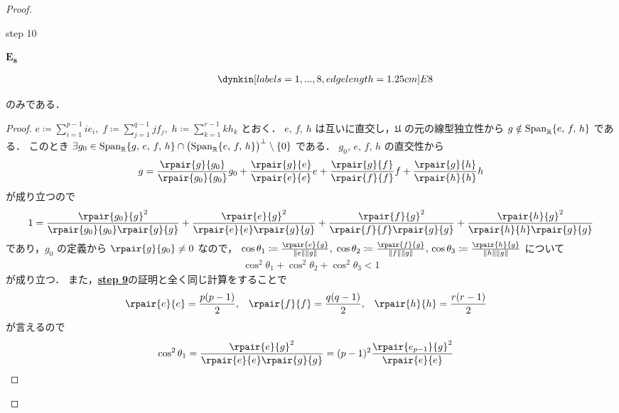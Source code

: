 \documentclass[rep_main]{subfiles}
\begin{document}
\begin{proof}
\begin{mylem}[label=lem:classification-step-10,breakable]{step 10}
\begin{description}
			\item[$\bm{E_8}$] 
			\begin{align}
				\dynkin[%
						labels={1,...,8},
						edge length=1.25cm
					] E8
			\end{align}
		\end{description}
		のみである．
	\end{mylem}
	
	\begin{proof}
		$e \coloneqq \sum_{i = 1}^{p-1} ie_i,\; f \coloneqq \sum_{j=1}^{q-1} jf_j,\; h \coloneqq \sum_{k=1}^{r-1} kh_k$ とおく．
		$e,\, f,\, h$ は互いに直交し，$\mathfrak{U}$ の元の線型独立性から $g \notin \operatorname{Span}_{\mathbb{R}} \{e,\, f,\, h\}$ である．
		このとき $\exists g_0 \in \operatorname{Span}_{\mathbb{R}} \{g,\, e,\, f,\, h\} \cap \bigl(\operatorname{Span}_{\mathbb{R}} \{e,\, f,\, h\}\bigr)^\perp \setminus \{0\}$ である．
		$g_0,\, e,\, f,\, h$ の直交性から
		\begin{align}
			g = \frac{\rpair{g}{g_0}}{\rpair{g_0}{g_0}} g_0 + \frac{\rpair{g}{e}}{\rpair{e}{e}} e + \frac{\rpair{g}{f}}{\rpair{f}{f}} f + \frac{\rpair{g}{h}}{\rpair{h}{h}} h 
		\end{align}
		が成り立つので
		\begin{align}
			1 = \frac{\rpair{g_0}{g}^2}{\rpair{g_0}{g_0} \rpair{g}{g}} + \frac{\rpair{e}{g}^2}{\rpair{e}{e} \rpair{g}{g}} + \frac{\rpair{f}{g}^2}{\rpair{f}{f} \rpair{g}{g}} + \frac{\rpair{h}{g}^2}{\rpair{h}{h} \rpair{g}{g}}
		\end{align}
		であり，$g_0$ の定義から $\rpair{g}{g_0} \neq 0$ なので，
		$\cos \theta_1 \coloneqq \frac{\rpair{e}{g}}{\norm*{e}\norm*{g}},\; \cos \theta_2 \coloneqq \frac{\rpair{f}{g}}{\norm*{f}\norm*{g}},\, \cos \theta_3 \coloneqq \frac{\rpair{h}{g}}{\norm*{h}\norm*{g}}$ について
		\begin{align}
			\label{ineq:step10-1}
			\cos^2\theta_1 + \cos^2 \theta_2 + \cos^2 \theta_3 < 1
		\end{align}
		が成り立つ．
		また，\hyperref[lem:classification-step-9]{\textsf{\textbf{step 9}}}の証明と全く同じ計算をすることで
		\begin{align}
			\rpair{e}{e} &= \frac{p(p-1)}{2}, & \rpair{f}{f} &= \frac{q(q-1)}{2}, & \rpair{h}{h} &= \frac{r(r-1)}{2}
		\end{align}
		が言えるので
		\begin{align}
			\cos^2 \theta_1 
			&= \frac{\rpair{e}{g}^2}{\rpair{e}{e} \rpair{g}{g}} 
			= (p-1)^2\frac{\rpair{e_{p-1}}{g}^2}{\rpair{e}{e}}

\end{align}
\end{proof}
\end{proof}
\end{document}
